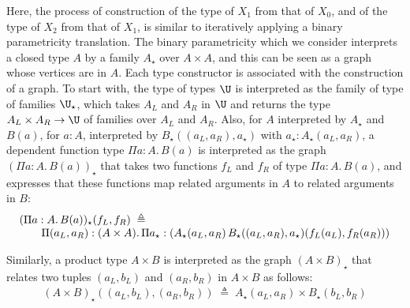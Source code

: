 \documentclass{msc}
\newcommand{\defeq}{\ensuremath{\triangleq}}
\newcommand{\kstar}{{\star}}
\begin{document}
Here, the process of construction of the type of $X_1$ from that of $X_0$, and of the type of $X_2$ from that of $X_1$, is similar to iteratively applying a binary parametricity translation. The binary parametricity which we consider interprets a closed type $A$ by a family $A_\kstar$ over $A \times A$, and this can be seen as a graph whose vertices are in $A$. Each type constructor is associated with the construction of a graph. To start with, the type of types $\U$ is interpreted as the family of type of families ${\U}_\kstar$, which takes $A_L$ and $A_R$ in $\U$ and returns the type $A_L \times A_R \rightarrow \U$ of families over $A_L$ and $A_R$. Also, for $A$ interpreted by $A_\kstar$ and $B(a)$, for $a:A$, interpreted by $B_\kstar((a_L,a_R),a_\kstar)$ with $a_\kstar:A_\kstar(a_L,a_R)$, a dependent function type $\Pi a: A.\, B(a)$ is interpreted as the graph $(\Pi a: A.\, B(a))_\kstar$ that takes two functions $f_L$ and $f_R$ of type $\Pi a: A.\, B(a)$, and expresses that these functions map related arguments in $A$ to related arguments in $B$:
\begin{equation*}
  \begin{array}{l}
  (\Pi a: A.\, B(a))_\kstar(f_L,f_R) \; \defeq \\
  \multicolumn{1}{r}{\qquad\Pi (a_L,a_R): (A \times A).\, \Pi a_\kstar: (A_\kstar(a_L,a_R)\, B_\kstar((a_L,a_R),a_\kstar)(f_L(a_L),f_R(a_R)))}
  \end{array}
\end{equation*}

Similarly, a product type $A \times B$ is interpreted as the graph $(A \times B)_\kstar$ that relates two tuples $(a_L,b_L)$ and $(a_R,b_R)$ in $A \times B$ as follows:
\begin{align*}
  (A \times B)_\kstar((a_L,b_L),(a_R,b_R)) \; \defeq \; A_\kstar(a_L,a_R) \times B_\kstar(b_L,b_R)
\end{align*}
\end{document}
